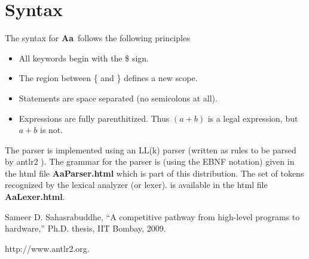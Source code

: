 \documentclass{article}
\newcommand{\Aa}{{\bf Aa}~}
\begin{document}
\section{Syntax} \label{sec:Syntax}

The syntax for \Aa follows the following
principles
\begin{itemize}
\item All keywords begin with the \$ sign.
\item The region between \{ and \} defines a new scope.
\item Statements are space separated (no semicolons at all).
\item Expressions are fully parenthitized.  Thus
$(a + b)$ is a legal expression, but $a+b$ is not.
\end{itemize}

The parser is implemented using 
an LL(k) parser (written as rules to be parsed by antlr2 \cite{ref:antlr2}).
The grammar for the parser is (using the EBNF notation) given in 
the html file {\bf AaParser.html} which is part of this distribution. 
The set of tokens recognized by the lexical analyzer (or lexer).
is available in the html file {\bf AaLexer.html}.

\begin{thebibliography}{99}
Sameer D. Sahasrabuddhe,
``A competitive pathway from high-level programs to hardware,''
Ph.D. thesis, IIT Bombay, 2009.

http://www.antlr2.org.
\end{thebibliography}
\end{document}
